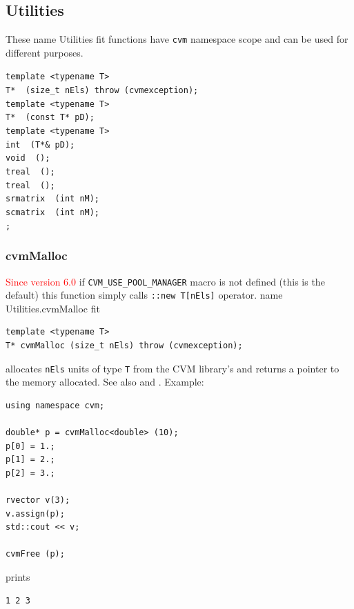 \subsection{Utilities}
These%
\pdfdest name {Utilities} fit{}
functions have \verb"cvm" namespace scope and
can be used for different purposes.

\bigskip
\noindent
\verb"template <typename T>"\\
\verb"T* "\verb" (size_t nEls) throw (cvmexception);"\\
\verb"template <typename T>"\\
\verb"T* "\verb" (const T* pD);"\\
\verb"template <typename T>"\\
\verb"int "\verb" (T*& pD);"\\
\verb"void "\verb" ();"\\
\verb"treal "\verb" ();"\\
\verb"treal "\verb" ();"\\
\verb"srmatrix "\verb" (int nM);"\\
\verb"scmatrix "\verb" (int nM);"\\
\verb";"\\
\verb""
\newpage




\subsubsection{cvmMalloc}
\textcolor{red}{Since version 6.0} if \verb"CVM_USE_POOL_MANAGER" macro is not defined (this is the default)
this function simply calls \verb"::new T[nEls]" operator.%
\pdfdest name {Utilities.cvmMalloc} fit
\begin{verbatim}
template <typename T>
T* cvmMalloc (size_t nEls) throw (cvmexception);
\end{verbatim}
allocates \verb"nEls" units of type \verb"T"
from the CVM library's  and returns
a pointer to the memory allocated. 
See also  and
.
Example:
\begin{Verbatim}
using namespace cvm;

double* p = cvmMalloc<double> (10);
p[0] = 1.;
p[1] = 2.;
p[2] = 3.;

rvector v(3);
v.assign(p);
std::cout << v;

cvmFree (p);
\end{Verbatim}
prints
\begin{Verbatim}
1 2 3
\end{Verbatim}
\newpage




